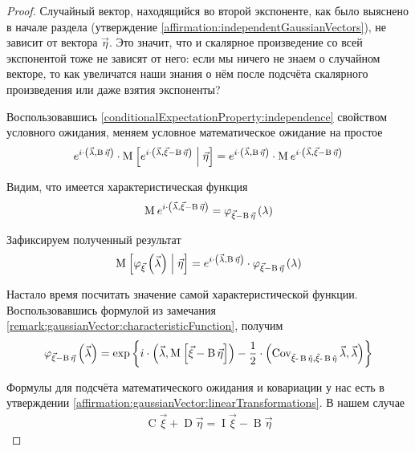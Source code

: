 \begin{proof}
  Случайный вектор, находящийся во второй экспоненте, как было выяснено в
  начале раздела (утверждение \ref{affirmation:independentGaussianVectors}),
  не зависит от вектора $\vec{\eta}$. Это значит, что и скалярное произведение
  со всей экспонентой тоже не зависят от него: если мы ничего не знаем о
  случайном векторе, то как увеличатся наши знания о нём после подсчёта
  скалярного произведения или даже взятия экспоненты?

  Воспользовавшись \ref{conditionalExpectationProperty:independence} свойством
  условного ожидания, меняем условное математическое ожидание на простое
  $$e^{i \cdot \left( \vec{\lambda}, \operatorname{B} \vec{\eta} \right)}
      \cdot \operatorname{M}_{} \left[ e^{i \cdot \left( \vec{\lambda},
          \vec{\xi} - \operatorname{B} \vec{\eta} \right)}
      \;\middle|\; \vec{\eta} \right]
      = e^{i \cdot \left( \vec{\lambda}, \operatorname{B} \vec{\eta} \right)}
          \cdot \operatorname{M}_{} e^{i \cdot \left( \vec{\lambda},
        \vec{\xi} - \operatorname{B} \vec{\eta} \right)}$$

  Видим, что имеется характеристическая функция
  $$\operatorname{M}_{} e^{i \cdot \left( \vec{\lambda},
      \vec{\xi} - \operatorname{B} \vec{\eta} \right)}
      = \varphi_{\vec{\xi} - \operatorname{B} \vec{\eta}}\left(
      \lambda \right)$$

  Зафиксируем полученный результат
  \begin{equation}\label{eq:normalCor:conditionalExpectation}
      \operatorname{M}_{} \left[ \varphi_{\vec{\xi}}\left( \vec{\lambda} \right) \;\middle|\; \vec{\eta} \right]
      = e^{i \cdot \left( \vec{\lambda}, \operatorname{B} \vec{\eta} \right)}
      \cdot \varphi_{\vec{\xi} - \operatorname{B} \vec{\eta}}\left(
          \lambda \right)
  \end{equation}

  Настало время посчитать значение самой характеристической функции.
  Воспользовавшись формулой из замечания
  \ref{remark:gaussianVector:characteristicFunction}, получим
  \begin{align*}
      \varphi_{\vec{\xi} - \operatorname{B} \vec{\eta}}\left(
      \vec{\lambda} \right)
      = \exp{\left\{ i \cdot \left( \vec{\lambda},
      \Mean{\vec{\xi} - \operatorname{B} \vec{\eta}} \right)
      - \frac{1}{2} \cdot \left( \dCov{\vec{\xi}
          - \operatorname{B} \vec{\eta}} \vec{\lambda},
          \vec{\lambda} \right) \right\}}
  \end{align*}

  Формулы для подсчёта математического ожидания и ковариации у нас есть в
  утверждении \ref{affirmation:gaussianVector:linearTransformations}.
  В нашем случае
  \begin{align*}
      \operatorname{C} \vec{\xi} + \operatorname{D} \vec{\eta}
      = \operatorname{I} \vec{\xi} - \operatorname{B} \vec{\eta}
  \end{align*}


\end{proof}
